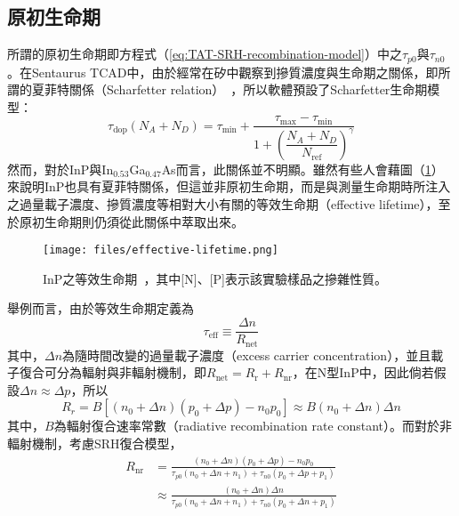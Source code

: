 \subsection{原初生命期}
所謂的原初生命期即方程式（\ref{eq:TAT-SRH-recombination-model}）中之$\tau_{p0}$與$\tau_{n0}$。在Sentaurus TCAD中，由於經常在矽中觀察到摻質濃度與生命期之關係，即所謂的夏菲特關係（Scharfetter relation）~\cite{fossum1982physical}\cite{fossum1983carrier}，所以軟體預設了Scharfetter生命期模型：
\begin{equation}
\label{eq:Scharfetter-relation}
\tau_\text{dop}(N_A+N_D)=\tau_\text{min}+\frac{\tau_\text{max}-\tau_\text{min}}{1+\left(\dfrac{N_A+N_D}{N_\text{ref}}\right)^\gamma}
\end{equation}
\hspace{2em}然而，對於InP與In$_{0.53}$Ga$_{0.47}$As而言，此關係並不明顯。雖然有些人會藉圖（\ref{fig:effective-lifetimen}）來說明InP也具有夏菲特關係，但這並非原初生命期，而是與測量生命期時所注入之過量載子濃度、摻質濃度等相對大小有關的等效生命期（effective lifetime），至於原初生命期則仍須從此關係中萃取出來。
\begin{figure}[h]
\centering
\texttt{[image: files/effective-lifetime.png]}
\caption[InP之等效生命期]{InP之等效生命期~\cite{liu1999excess}\cite{rosenwaks1992picosecond}\cite{yater1994minority}\cite{jenkins1991minority}\cite{landis1991photoluminescence}\cite{inspec1991properties}\cite{bothra1991surface}\cite{rosenwaks1991evidence}\cite{ahrenkiel1988photoluminescence}，其中[N]、[P]表示該實驗樣品之摻雜性質。}
\label{fig:effective-lifetimen}
\end{figure}
舉例而言，由於等效生命期定義為~\cite{orton1990electrical}
\begin{equation}
\tau_\text{eff}\equiv\frac{\Delta n}{R_\text{net}}
\end{equation}
其中，$\Delta n$為隨時間改變的過量載子濃度（excess carrier concentration），並且載子復合可分為輻射與非輻射機制，即$R_\text{net}=R_\text{r}+R_\text{nr}$，在N型InP中，因此倘若假設$\Delta n\approx\Delta p$，所以
\begin{equation}
R_r=B\left[(n_0+\Delta n)(p_0+\Delta p)-n_0p_0\right]\approx B(n_0+\Delta n)\Delta n
\end{equation}
其中，$B$為輻射復合速率常數（radiative recombination rate constant）。而對於非輻射機制，考慮SRH復合模型，
\begin{equation}
\begin{aligned}
R_\text{nr}&=\frac{(n_0+\Delta n)(p_0+\Delta p)-n_0p_0}{\tau_{p0}(n_0+\Delta n+n_1)+\tau_{n0}(p_0+\Delta p+p_1)}\\[5pt]
&\approx\frac{(n_0+\Delta n)\Delta n}{\tau_{p0}(n_0+\Delta n+n_1)+\tau_{n0}(p_0+\Delta n+p_1)}
\end{aligned}
\end{equation}

